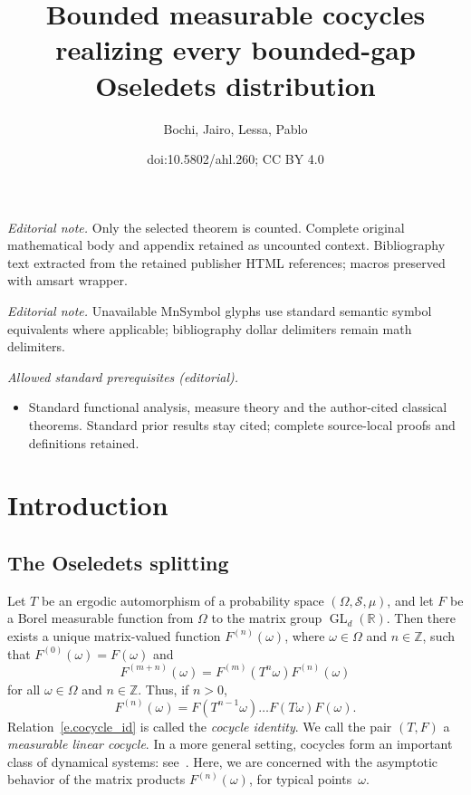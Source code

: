 \documentclass[10pt]{amsart}
\title{Bounded measurable cocycles realizing every bounded-gap Oseledets distribution}
\author{Bochi, Jairo, Lessa, Pablo}
\date{doi:10.5802/ahl.260; CC BY 4.0}
\theoremstyle{definition}\newtheorem{defi}[theo]{Definition}\newtheorem{rema}[theo]{Remark}\newtheorem{exam}[theo]{Example}\newtheorem{exem}[theo]{Example}\newtheorem{nota}[theo]{Notation}
\newcommand{\Z}{\mathbb{Z}}
\newcommand{\R}{\mathbb{R}}
\newcommand{\clS}{\mathcal{S}}
\DeclareMathOperator{\GL}{GL}
\begin{document}
\maketitle
\noindent\textit{Editorial note.} Only the selected theorem is counted. Complete original mathematical body and appendix retained as uncounted context. Bibliography text extracted from the retained publisher HTML references; macros preserved with amsart wrapper.\par\medskip
\noindent\textit{Editorial note.} Unavailable MnSymbol glyphs use standard semantic symbol equivalents where applicable; bibliography dollar delimiters remain math delimiters.\par\medskip
\noindent\textit{Allowed standard prerequisites (editorial).}\begin{itemize}
\item Standard functional analysis, measure theory and the author-cited classical theorems. Standard prior results stay cited; complete source-local proofs and definitions retained.
\end{itemize}\medskip

\section{Introduction}

\subsection{The Oseledets splitting}

Let $T$ be an ergodic automorphism of a probability space $(\Omega,\clS,\mu)$, and let $F$ be a Borel measurable function from $\Omega$ to the matrix group $\GL_d(\R)$. Then there exists a unique matrix-valued function $F^{(n)}(\omega)$, where $\omega \in \Omega$ and $n \in \Z$, such that $F^{(0)}(\omega) = F(\omega)$ and
\begin{equation}\label{e.cocycle_id}
F^{(m+n)}(\omega) = F^{(m)}(T^n \omega) F^{(n)}(\omega)
\end{equation}
for all $\omega \in \Omega$ and $n \in \Z$. Thus, if $n > 0$,
\begin{equation}
F^{(n)}(\omega) = F\left(T^{n-1} \omega\right)\dots F(T\omega) F(\omega).
\end{equation}
Relation~\eqref{e.cocycle_id} is called the \emph{cocycle identity}. We call the pair $(T,F)$ a \emph{measurable linear cocycle}. In a more general setting, cocycles form an important class of dynamical systems: see~\cite[Section~1.3.k]{HK}. Here, we are concerned with the asymptotic behavior of the matrix products $F^{(n)}(\omega)$, for typical points~$\omega$.
\end{document}

